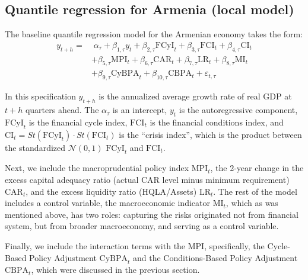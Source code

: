 \documentclass[12pt,a4paper]{article}
\begin{document}
\subsection{Quantile regression for Armenia (local model)}
The baseline quantile regression model for the Armenian economy takes the form:
\begin{equation}
    \label{eq:local_qr}
    \begin{aligned}
    y_{t+h} = 
    &\;\alpha_\tau + \beta_{1, \tau}y_t + \beta_{2, \tau}\text{FCyI}_t + \beta_{3, \tau}\text{FCI}_t + \beta_{4, \tau}\text{CI}_t \\
    &+ \beta_{5, \tau}\text{MPI}_t + \beta_{6, \tau}\text{CAR}_t + \beta_{7, \tau}\text{LR}_t + \beta_{8, \tau}\text{MI}_t \\
    &+ \beta_{9, \tau}\text{CyBPA}_t + \beta_{10, \tau}\text{CBPA}_t + \varepsilon_{t, \tau}
    \end{aligned}
\end{equation}

In this specification $y_{t+h}$ is the annualized average growth rate of real GDP at $t+h$ quarters ahead. The $\alpha_\tau$ is an intercept, $y_t$ is the autoregressive component, $\text{FCyI}_t$ is the financial cycle index, $\text{FCI}_t$ is the financial conditions index, and $\text{CI}_t = St(\text{FCyI}_t) \cdot St(\text{FCI}_t)$ is the ``crisis index'', which is the product between the standardized $\mathcal{N}(0, 1)$ $\text{FCyI}_t$ and $\text{FCI}_t$.

Next, we include the macroprudential policy index $\text{MPI}_t$, the 2-year change in the excess capital adequacy ratio (actual CAR level minus minimum requirement) $\text{CAR}_t$, and the excess liquidity ratio (HQLA/Assets) $\text{LR}_t$.
The rest of the model includes a control variable, the macroeconomic indicator $\text{MI}_t$, which as was mentioned above, has two roles: capturing the risks originated not from financial system, but from broader macroeconomy, and serving as a control variable.

Finally, we include the interaction terms with the MPI, specifically, the Cycle-Based Policy Adjustment $\text{CyBPA}_t$ and the Conditions-Based Policy Adjustment $\text{CBPA}_t$, which were discussed in the previous section.
\end{document}
